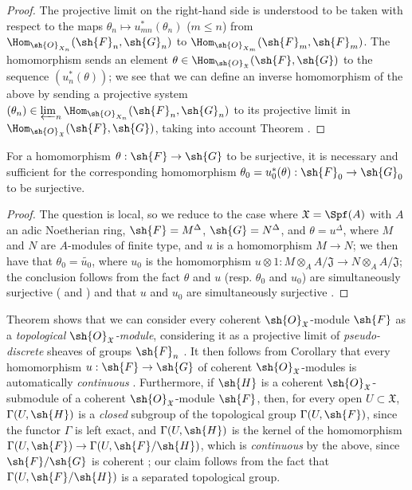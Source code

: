 \begin{proof}
The projective limit on the right-hand side is understood to be taken with respect to the maps $\theta_n\mapsto u_{mn}^*(\theta_n)$ ($m\leq n$) from $\Hom_{\sh{O}_{X_n}}(\sh{F}_n,\sh{G}_n)$ to $\Hom_{\sh{O}_{X_m}}(\sh{F}_m,\sh{F}_m)$.
The homomorphism  sends an element $\theta\in\Hom_{\sh{O}_\mathfrak{X}}(\sh{F},\sh{G})$ to the sequence $(u_n^*(\theta))$; we see that we can define an inverse homomorphism of the above by sending a projective system $(\theta_n)\in\varprojlim_n\Hom_{\sh{O}_{X_n}}(\sh{F}_n,\sh{G}_n)$ to its projective limit in $\Hom_{\sh{O}_\mathfrak{X}}(\sh{F},\sh{G})$, taking into account Theorem .
\end{proof}

\begin{corollary}[10.11.5]
\label{I.10.11.5}
For a homomorphism $\theta:\sh{F}\to\sh{G}$ to be surjective, it is necessary and sufficient for the corresponding homomorphism $\theta_0=u_0^*(\theta):\sh{F}_0\to\sh{G}_0$ to be surjective.
\end{corollary}

\begin{proof}
The question is local, so we reduce to the case where $\mathfrak{X}=\Spf(A)$ with $A$ an adic Noetherian ring, $\sh{F}=M^\Delta$, $\sh{G}=N^\Delta$, and $\theta=u^\Delta$, where $M$ and $N$ are $A$-modules of finite type, and $u$ is a homomorphism $M\to N$; we then have that $\theta_0=\widetilde{u_0}$, where $u_0$ is the homomorphism $u\otimes 1:M\otimes_A A/\mathfrak{J}\to N\otimes_A A/\mathfrak{J}$; the conclusion follows from the fact $\theta$ and $u$ (resp. $\theta_0$ and $u_0$) are simultaneously surjective ( and ) and that $u$ and $u_0$ are simultaneously surjective .
\end{proof}

\begin{env}[10.11.6]
\label{I.10.11.6}
Theorem  shows that we can consider every coherent $\sh{O}_\mathfrak{X}$-module $\sh{F}$ as a \emph{topological $\sh{O}_\mathfrak{X}$-module}, considering it as a projective limit of \emph{pseudo-discrete} sheaves of groups $\sh{F}_n$ .
It then follows from Corollary  that every homomorphism $u:\sh{F}\to\sh{G}$ of coherent $\sh{O}_\mathfrak{X}$-modules is automatically \emph{continuous}
.
Furthermore, if $\sh{H}$ is a coherent $\sh{O}_\mathfrak{X}$-submodule of a coherent $\sh{O}_\mathfrak{X}$-module $\sh{F}$, then, for every open $U\subset\mathfrak{X}$, $\Gamma(U,\sh{H})$ is a \emph{closed} subgroup of the topological group $\Gamma(U,\sh{F})$, since the functor $\Gamma$ is left exact, and $\Gamma(U,\sh{H})$ is the kernel of the homomorphism $\Gamma(U,\sh{F})\to\Gamma(U,\sh{F}/\sh{H})$, which is \emph{continuous} by the above, since $\sh{F}/\sh{G}$ is coherent ; our claim follows from the fact that $\Gamma(U,\sh{F}/\sh{H})$ is a separated topological group.
\end{env}

